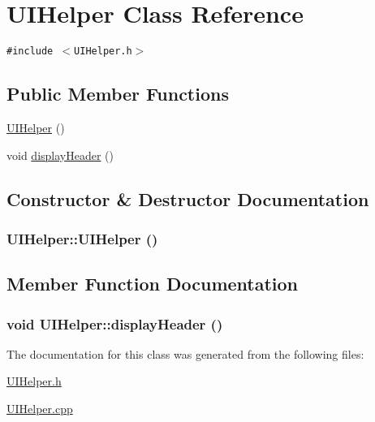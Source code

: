 \hypertarget{class_u_i_helper}{
\section{UIHelper Class Reference}
\label{class_u_i_helper}
}
{\tt \#include $<$UIHelper.h$>$}

\subsection*{Public Member Functions}
\begin{CompactItemize}
\item 
\hyperlink{class_u_i_helper_064f3bdbb8bc6545e365a04e701b2cb3}{UIHelper} ()
\item 
void \hyperlink{class_u_i_helper_626a53a3308909e66c67873826055ff9}{display\-Header} ()
\end{CompactItemize}


\subsection{Constructor \& Destructor Documentation}
\hypertarget{class_u_i_helper_064f3bdbb8bc6545e365a04e701b2cb3}{
\subsubsection[UIHelper]{\setlength{\rightskip}{0pt plus 5cm}UIHelper::UIHelper ()}}
\label{class_u_i_helper_064f3bdbb8bc6545e365a04e701b2cb3}




\subsection{Member Function Documentation}
\hypertarget{class_u_i_helper_626a53a3308909e66c67873826055ff9}{
\subsubsection[displayHeader]{\setlength{\rightskip}{0pt plus 5cm}void UIHelper::display\-Header ()}}
\label{class_u_i_helper_626a53a3308909e66c67873826055ff9}




The documentation for this class was generated from the following files:\begin{CompactItemize}
\item 
\hyperlink{_u_i_helper_8h}{UIHelper.h}\item 
\hyperlink{_u_i_helper_8cpp}{UIHelper.cpp}\end{CompactItemize}
